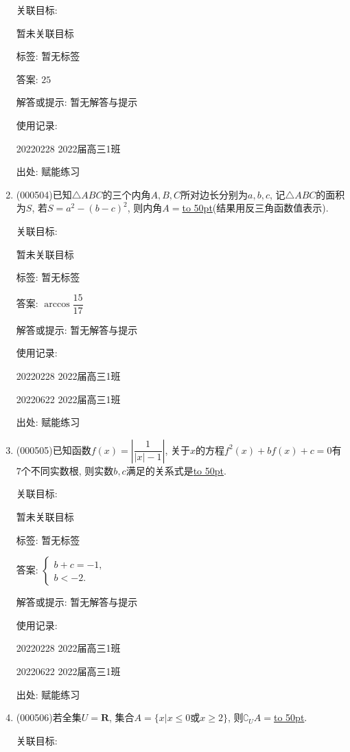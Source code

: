 \documentclass[10pt,a4paper]{article}
\newcommand{\blank}[1]{\underline{\hbox to #1pt{}}}
\begin{document}
\begin{enumerate}[1.]
关联目标:

暂未关联目标



标签: 暂无标签

答案: $25$

解答或提示: 暂无解答与提示

使用记录:

20220228	2022届高三1班	


出处: 赋能练习
\item { (000504)}已知$\triangle ABC$的三个内角$A,B,C$所对边长分别为$a,b,c$, 记$\triangle ABC$的面积为$S$, 若$S=a^2-(b-c)^2$, 则内角$A=$\blank{50}(结果用反三角函数值表示).


关联目标:

暂未关联目标



标签: 暂无标签

答案: $\arccos \dfrac{15}{17}$

解答或提示: 暂无解答与提示

使用记录:

20220228	2022届高三1班	

20220622	2022届高三1班  	


出处: 赋能练习
\item { (000505)}已知函数$f(x)=\left|\dfrac1{|x|-1}\right|$, 关于$x$的方程$f^2(x)+bf(x)+c=0$有$7$个不同实数根, 则实数$b,c$满足的关系式是\blank{50}.


关联目标:

暂未关联目标



标签: 暂无标签

答案: $\begin{cases} b+c=-1, \\ b<-2.  \end{cases}$

解答或提示: 暂无解答与提示

使用记录:

20220228	2022届高三1班	

20220622	2022届高三1班  	


出处: 赋能练习
\item { (000506)}若全集$U=\mathbf{R}$, 集合$A=\{x|x\le 0\text{或} x\ge 2\}$, 则$\complement_U A=$\blank{50}.


关联目标:


\end{enumerate}
\end{document}
